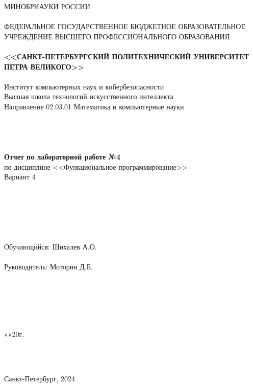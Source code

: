 \documentclass[11pt,a4paper,final]{article} %
\begin{document}
	
\thispagestyle{empty}

\begin{center}
	{\Large МИНОБРНАУКИ РОССИИ}\\
	~\\
	{\large ФЕДЕРАЛЬНОЕ ГОСУДАРСТВЕННОЕ БЮДЖЕТНОЕ ОБРАЗОВАТЕЛЬНОЕ УЧРЕЖДЕНИЕ ВЫСШЕГО ПРОФЕССИОНАЛЬНОГО ОБРАЗОВАНИЯ}\\
	~\\
	{\Large \bf <<САНКТ-ПЕТЕРБУРГСКИЙ ПОЛИТЕХНИЧЕСКИЙ УНИВЕРСИТЕТ ПЕТРА ВЕЛИКОГО>>}\\
	~\\
	{\large Институт компьютерных наук и кибербезопасности }\\
	{\large Высшая школа технологий искусственного интеллекта}\\
	{\large Направление 02.03.01 Математика и компьютерные науки}\\
	~\\
	~\\
	~\\
	~\\
	{\Large \bf  Отчет по лабораторной работе №4 }\\
	\vspace{3mm}
	{\Large {по дисциплине <<Функциональное программирование>>}}\\
	\vspace{3mm}
	{\Large {Вариант 4}}\\
	~\\
	~\\
	~\\
	~\\
	~\\
	~\\
	{\large Обучающийся: \underline{\hspace{3.5cm}} \hspace{12mm} Шихалев А.О.}\\
	~\\
	{\large Руководитель: \underline{\hspace{3.5cm}} \hspace{12mm} Моторин Д.Е.}\\
	~\\
	~\\
	~\\
	~\\
	~\\
\end{center}
\begin{flushright}
	
	«\underline{\hspace{1cm}}»\underline{\hspace{3cm}}20\underline{\hspace{0.7cm}}г.
\end{flushright}
~\\
~\\
\begin{center}
	{\large Санкт-Петербург, 2024}
\end{center}
\end{document}
